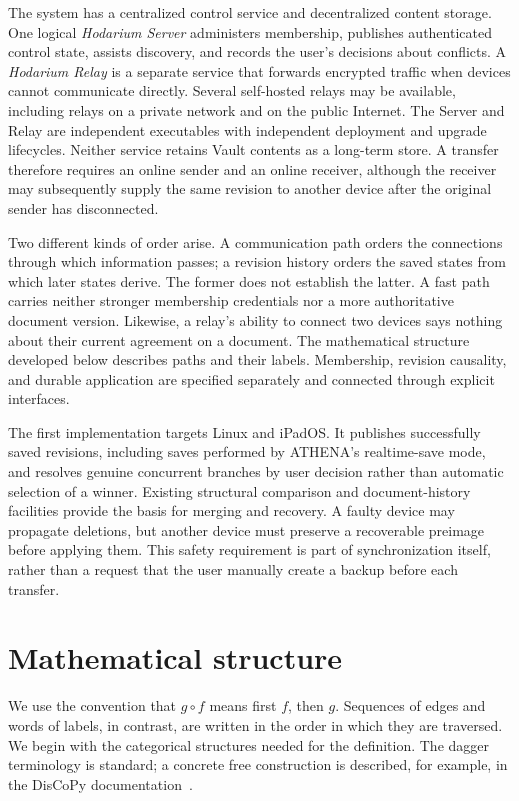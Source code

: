 \documentclass[11pt,a4paper]{article}
\theoremstyle{definition}
\theoremstyle{plain}
\begin{document}
The system has a centralized control service and decentralized content
storage. One logical \emph{Hodarium Server} administers membership,
publishes authenticated control state, assists discovery, and records
the user's decisions about conflicts. A \emph{Hodarium Relay} is a
separate service that forwards encrypted traffic when devices cannot
communicate directly. Several self-hosted relays may be available,
including relays on a private network and on the public Internet. The
Server and Relay are independent executables with independent deployment
and upgrade lifecycles. Neither service retains Vault contents as a
long-term store. A transfer therefore requires an online sender and an
online receiver, although the receiver may subsequently supply the same
revision to another device after the original sender has disconnected.

Two different kinds of order arise. A communication path orders the
connections through which information passes; a revision history orders
the saved states from which later states derive. The former does not
establish the latter. A fast path carries neither stronger membership
credentials nor a more authoritative document version. Likewise, a
relay's ability to connect two devices says nothing about their current
agreement on a document. The mathematical structure developed below
describes paths and their labels. Membership, revision causality, and
durable application are specified separately and connected through
explicit interfaces.

The first implementation targets Linux and iPadOS. It publishes
successfully saved revisions, including saves performed by ATHENA's
realtime-save mode, and resolves genuine concurrent branches by user
decision rather than automatic selection of a winner. Existing
structural comparison and document-history facilities provide the basis
for merging and recovery. A faulty device may propagate deletions, but
another device must preserve a recoverable preimage before applying
them. This safety requirement is part of synchronization itself, rather
than a request that the user manually create a backup before each
transfer.

\section{Mathematical structure}
\label{sec:mathematics}

We use the convention that $g\circ f$ means first $f$, then $g$.
Sequences of edges and words of labels, in contrast, are written in
the order in which they are traversed. We begin with the categorical
structures needed for the definition. The dagger terminology is
standard; a concrete free construction is described, for example,
in the DisCoPy documentation~\cite{dagger}.
\end{document}
